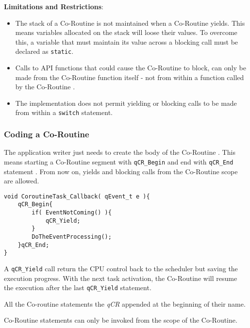 \textbf{Limitations and Restrictions}:

\begin{itemize}
    \item The stack of a Co-Routine  is not maintained when a Co-Routine  yields. This means variables allocated on the stack will loose their values. To overcome this, a variable that must maintain its value across a blocking call must be declared as \lstinline{static}.
    \item Calls to API functions that could cause the Co-Routine to block, can only be made from the Co-Routine  function itself - not from within a function called by the Co-Routine .
    \item The implementation does not permit yielding or blocking calls to be made from within a \lstinline{switch} statement.
\end{itemize}

\subsubsection{Coding a Co-Routine}
The application writer just needs to create the body of the Co-Routine . This means starting a Co-Routine segment with \lstinline{qCR_Begin}  and end with \lstinline{qCR_End} statement . From now on, yields and blocking calls from the Co-Routine scope are allowed. \\

\begin{lstlisting}[style=CStyle]
void CoroutineTask_Callback( qEvent_t e ){
    qCR_Begin{        
        if( EventNotComing() ){
            qCR_Yield;
        }
        DoTheEventProcessing();
    }qCR_End;
}
\end{lstlisting}   

A \lstinline{qCR_Yield}  call return the CPU control back to the scheduler but saving the execution progress. With the next task activation, the Co-Routine will resume the execution after the last \lstinline{qCR_Yield} statement. \\

\begin{tcolorbox}
\HandRight All the Co-routine statements the \textit{qCR} appended at the beginning of their name.
\end{tcolorbox}

\begin{tcolorbox}
\HandRight Co-Routine statements can only be invoked from the scope of the Co-Routine.
\end{tcolorbox}


